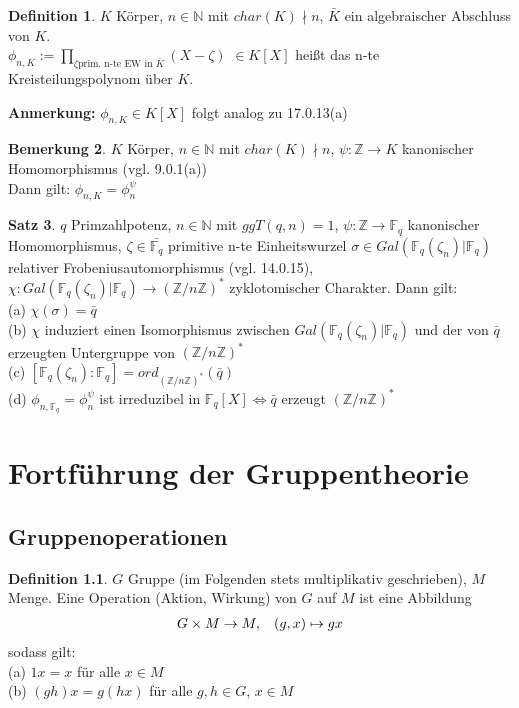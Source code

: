 \documentclass[10pt,a4paper,numbers=endperiod]{scrreprt}
\theoremstyle{definition}
\newtheorem{satz}{Satz}[section]
\newtheorem{defi}[satz]{Definition}
\newtheorem{bem}[satz]{Bemerkung}
\def\NN{{\mathbb N}}
\def\ZZ{{\mathbb Z}}
\def\FF{{\mathbb F}}
\begin{document}
\begin{defi}
	$K$ Körper, $n \in \NN$ mit $char(K) \nmid n$, $\bar{K}$ ein algebraischer Abschluss von $K$.\\
	$\phi_{n,K} := \prod\limits_{\zeta \text{prim. n-te EW in } \bar{K}} (X - \zeta)$ $\in K[X]$ heißt das n-te Kreisteilungspolynom über $K$.
\end{defi}

\textbf{Anmerkung:} $\phi_{n,K} \in K[X]$ folgt analog zu 17.0.13(a)

\begin{bem}
	$K$ Körper, $n \in \NN$ mit $char(K) \nmid n$, $\psi: \ZZ \rightarrow K$ kanonischer Homomorphismus (vgl. 9.0.1(a))\\
	Dann gilt: $\phi_{n,K} = \phi_n^\psi$
\end{bem}

\begin{satz}
	$q$ Primzahlpotenz, $n \in \NN$ mit $ggT(q,n) = 1$, $\psi: \ZZ \rightarrow \FF_q$ kanonischer Homomorphismus, $\zeta \in \bar{\FF_q}$ primitive n-te Einheitswurzel $\sigma \in Gal(\FF_q (\zeta_n)|\FF_q)$ relativer Frobeniusautomorphismus (vgl. 14.0.15), $\chi: Gal(\FF_q (\zeta_n)|\FF_q) \rightarrow (\ZZ/n\ZZ)^*$ zyklotomischer Charakter. Dann gilt:\\
	(a) $\chi(\sigma) = \bar{q}$\\
	(b) $\chi$ induziert einen Isomorphismus zwischen $Gal(\FF_q(\zeta_n)|\FF_q)$ und der von $\bar{q}$ erzeugten Untergruppe von $(\ZZ/n\ZZ)^*$\\
	(c) $[\FF_q(\zeta_n) : \FF_q] = ord_{(\ZZ/n\ZZ)^*} (\bar{q})$\\
	(d) $\phi_{n, \FF_q} = \phi_n^\psi$ ist irreduzibel in $\FF_q[X] \Leftrightarrow \bar{q}$ erzeugt $(\ZZ/n\ZZ)^*$
\end{satz}

\part{Fortführung der Gruppentheorie}


\chapter{Gruppenoperationen} 

\begin{defi}
	$G$ Gruppe (im Folgenden stets multiplikativ geschrieben), $M$ Menge. Eine Operation (Aktion, Wirkung) von $G$ auf $M$ ist eine Abbildung\\
	\begin{align*}
		G \times M \rightarrow M, \hspace{3mm} (g,x) \mapsto gx
	\end{align*}
	sodass gilt:\\
	(a) $1x = x$ für alle $x \in M$\\
	(b) $(gh)x = g(hx)$ für alle $g, h \in G$, $x \in M$
\end{defi}
\end{document}
